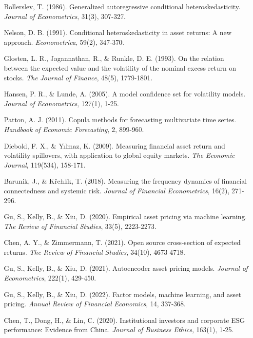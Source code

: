\documentclass[12pt,a4paper]{article}
\begin{document}
\begin{thebibliography}{99}
Bollerslev, T. (1986). Generalized autoregressive conditional heteroskedasticity. \textit{Journal of Econometrics}, 31(3), 307-327.

Nelson, D. B. (1991). Conditional heteroskedasticity in asset returns: A new approach. \textit{Econometrica}, 59(2), 347-370.

Glosten, L. R., Jagannathan, R., \& Runkle, D. E. (1993). On the relation between the expected value and the volatility of the nominal excess return on stocks. \textit{The Journal of Finance}, 48(5), 1779-1801.

Hansen, P. R., \& Lunde, A. (2005). A model confidence set for volatility models. \textit{Journal of Econometrics}, 127(1), 1-25.

Patton, A. J. (2011). Copula methods for forecasting multivariate time series. \textit{Handbook of Economic Forecasting}, 2, 899-960.

Diebold, F. X., \& Yılmaz, K. (2009). Measuring financial asset return and volatility spillovers, with application to global equity markets. \textit{The Economic Journal}, 119(534), 158-171.

Baruník, J., \& Křehlík, T. (2018). Measuring the frequency dynamics of financial connectedness and systemic risk. \textit{Journal of Financial Econometrics}, 16(2), 271-296.

Gu, S., Kelly, B., \& Xiu, D. (2020). Empirical asset pricing via machine learning. \textit{The Review of Financial Studies}, 33(5), 2223-2273.

Chen, A. Y., \& Zimmermann, T. (2021). Open source cross-section of expected returns. \textit{The Review of Financial Studies}, 34(10), 4673-4718.

Gu, S., Kelly, B., \& Xiu, D. (2021). Autoencoder asset pricing models. \textit{Journal of Econometrics}, 222(1), 429-450.

Gu, S., Kelly, B., \& Xiu, D. (2022). Factor models, machine learning, and asset pricing. \textit{Annual Review of Financial Economics}, 14, 337-368.

Chen, T., Dong, H., \& Lin, C. (2020). Institutional investors and corporate ESG performance: Evidence from China. \textit{Journal of Business Ethics}, 163(1), 1-25.


\end{thebibliography}
\end{document}
